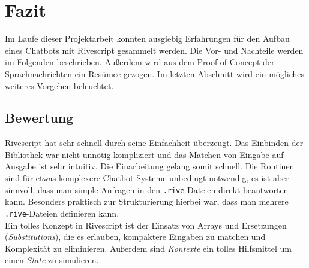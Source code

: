 \chapter{Fazit}
Im Laufe dieser Projektarbeit konnten ausgiebig Erfahrungen für den Aufbau eines Chatbots mit Rivescript gesammelt werden. Die Vor- und Nachteile werden im Folgenden beschrieben. Außerdem wird aus dem Proof-of-Concept der Sprachnachrichten ein Resümee gezogen. Im letzten Abschnitt wird ein mögliches weiteres Vorgehen beleuchtet.

\section{Bewertung}
Rivescript hat sehr schnell durch seine Einfachheit überzeugt. Das Einbinden der Bibliothek war nicht unnötig kompliziert und das Matchen von Eingabe auf Ausgabe ist sehr intuitiv. Die Einarbeitung gelang somit schnell. Die Routinen sind für etwas komplexere Chatbot-Systeme unbedingt notwendig, es ist aber sinnvoll, dass man simple Anfragen in den \texttt{.rive}-Dateien direkt beantworten kann. Besonders praktisch zur Strukturierung hierbei war, dass man mehrere \texttt{.rive}-Dateien definieren kann.\\
Ein tolles Konzept in Rivescript ist der Einsatz von Arrays und Ersetzungen (\textit{Substitutions}), die es erlauben, kompaktere Eingaben zu matchen und Komplexität zu eliminieren. Außerdem sind \textit{Kontexte} ein tolles Hilfsmittel um einen \textit{State} zu simulieren.

